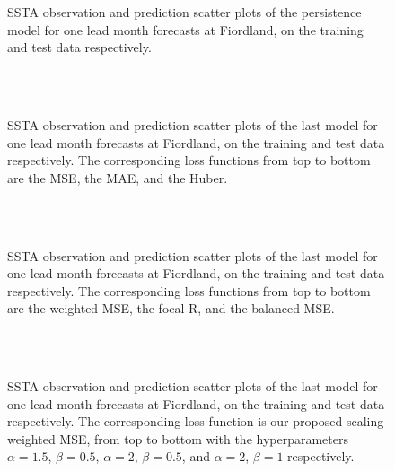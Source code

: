 \documentclass[11pt, a4paper]{article}
\begin{document}
\begin{figure}[H]
\centering
{}
\caption{SSTA observation and prediction scatter plots of the persistence model for one lead month forecasts at Fiordland, on the training and test data respectively.}
\end{figure}

\begin{figure}[H]
\centering
{}
\\
\\
\caption{SSTA observation and prediction scatter plots of the last model for one lead month forecasts at Fiordland, on the training and test data respectively. The corresponding loss functions from top to bottom are the MSE, the MAE, and the Huber.}
\end{figure}

\begin{figure}[H]
\centering
{}
\\
\\
\caption{SSTA observation and prediction scatter plots of the last model for one lead month forecasts at Fiordland, on the training and test data respectively. The corresponding loss functions from top to bottom are the weighted MSE, the focal-R, and the balanced MSE.}
\end{figure}

\begin{figure}[H]
\centering
{}
\\
\\
\caption{SSTA observation and prediction scatter plots of the last model for one lead month forecasts at Fiordland, on the training and test data respectively. The corresponding loss function is our proposed scaling-weighted MSE, from top to bottom with the hyperparameters $\alpha=1.5$, $\beta=0.5$, $\alpha=2$, $\beta=0.5$, and $\alpha=2$, $\beta=1$ respectively.}
\end{figure}
\end{document}
